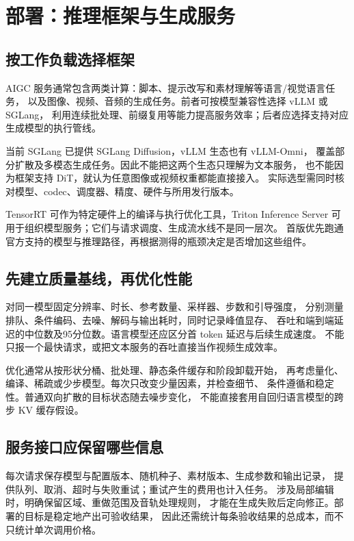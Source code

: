 \chapter{部署：推理框架与生成服务}
\label{aigc:deployment}

\section{按工作负载选择框架}

AIGC 服务通常包含两类计算：脚本、提示改写和素材理解等语言/视觉语言任务，
以及图像、视频、音频的生成任务。前者可按模型兼容性选择 vLLM 或 SGLang，
利用连续批处理、前缀复用等能力提高服务效率；后者应选择支持对应生成模型的执行管线。

当前 SGLang 已提供 SGLang Diffusion，vLLM 生态也有 vLLM-Omni，
覆盖部分扩散及多模态生成任务。因此不能把这两个生态只理解为文本服务，
也不能因为框架支持 DiT，就认为任意图像或视频权重都能直接接入。
实际选型需同时核对模型、codec、调度器、精度、硬件与所用发行版本。

TensorRT 可作为特定硬件上的编译与执行优化工具，Triton Inference Server
可用于组织模型服务；它们与请求调度、生成流水线不是同一层次。
首版优先跑通官方支持的模型与推理路径，再根据测得的瓶颈决定是否增加这些组件。

\section{先建立质量基线，再优化性能}

对同一模型固定分辨率、时长、参考数量、采样器、步数和引导强度，
分别测量排队、条件编码、去噪、解码与输出耗时，同时记录峰值显存、
吞吐和端到端延迟的中位数及95分位数。语言模型还应区分首 token 延迟与后续生成速度。
不能只报一个最快请求，或把文本服务的吞吐直接当作视频生成效率。

优化通常从按形状分桶、批处理、静态条件缓存和阶段卸载开始，
再考虑量化、编译、稀疏或少步模型。每次只改变少量因素，并检查细节、
条件遵循和稳定性。普通双向扩散的目标状态随去噪步变化，
不能直接套用自回归语言模型的跨步 KV 缓存假设。

\section{服务接口应保留哪些信息}

每次请求保存模型与配置版本、随机种子、素材版本、生成参数和输出记录，
提供队列、取消、超时与失败重试；重试产生的费用也计入任务。
涉及局部编辑时，明确保留区域、重做范围及音轨处理规则，
才能在生成失败后定向修正。部署的目标是稳定地产出可验收结果，
因此还需统计每条验收结果的总成本，而不只统计单次调用价格。

